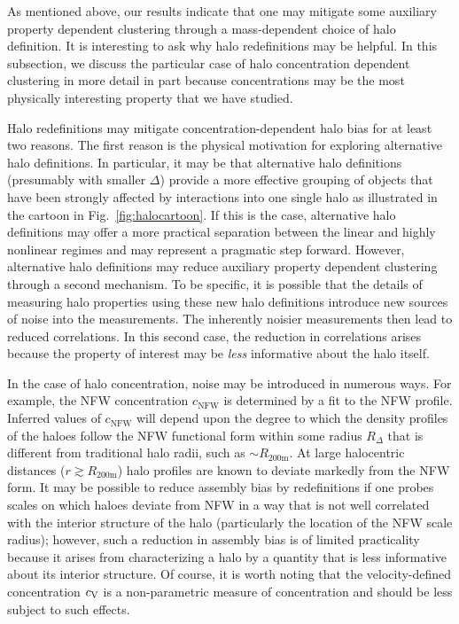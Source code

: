 \documentclass[usenatbib,fleqn]{mnras}
\begin{document}
As mentioned above, our results indicate that one may mitigate some auxiliary property dependent clustering through a mass-dependent choice of halo definition. It is interesting to ask why halo redefinitions may be helpful. In this subsection, we discuss the particular case of halo concentration dependent clustering in more detail in part because concentrations may be the most physically interesting property that we have studied.

Halo redefinitions may mitigate concentration-dependent halo bias for at least two reasons. 
The first reason is the physical motivation for exploring alternative halo definitions. In particular, it may be that alternative halo definitions (presumably with smaller $\Delta$) provide a more effective grouping of objects that have been strongly affected by interactions into one single halo as  illustrated in the cartoon in Fig.~\ref{fig:halocartoon}. If this is the case, alternative halo definitions may offer a more practical separation between the linear and highly nonlinear regimes and may represent a pragmatic step forward. However, alternative halo definitions may reduce auxiliary property dependent clustering through a second mechanism. To be specific, it is possible that the details of measuring halo properties using these new halo definitions introduce new sources of noise into the measurements. The inherently noisier measurements then lead to reduced correlations. In this second case, the reduction in correlations arises because the property of interest may be {\em less} informative about the halo itself.

In the case of halo concentration, noise may be introduced in numerous ways. For example, the NFW concentration $c_{\mathrm{NFW}}$ is determined by a fit to the NFW profile. Inferred values of $c_{\mathrm{NFW}}$ will depend upon the degree to which the density profiles of the haloes follow the NFW functional form within some radius $R_{\Delta}$ that is different from traditional halo radii, such as $\sim R_{200\text{m}}$. At large halocentric distances ($r \gtrsim R_{200\text{m}}$) halo profiles are known to deviate markedly from the NFW form. It may be possible to reduce assembly bias by redefinitions if one probes scales on which haloes deviate from NFW in a way that is not well correlated with the interior structure of the halo (particularly the location of the NFW scale radius); however, such a reduction in assembly bias is of limited practicality because it arises from characterizing a halo by a quantity that is less informative about its interior structure. Of course, it is worth noting that the velocity-defined concentration $c_{\rm V}$ is a non-parametric measure of concentration and should be less subject to such effects. 
\end{document}
